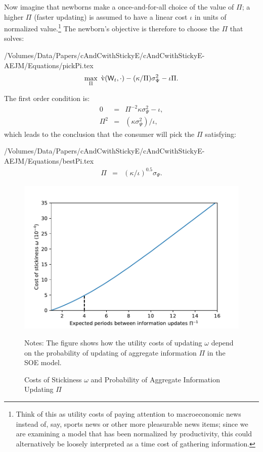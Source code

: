Now imagine that newborns make a once-and-for-all choice of the value of $\Pi$; a higher $\Pi$ (faster updating) is assumed to have a linear cost $\iota$ in units of normalized value.\footnote{Think of this as utility costs of paying attention to macroeconomic news instead of, say, sports news or other more pleasurable news items; since we are examining a model that has been normalized by productivity, this could alternatively be loosely interpreted as a time cost of gathering information.}  The newborn's objective is therefore to choose the $\Pi$ that solves:
\begin{verbatimwrite}{/Volumes/Data/Papers/cAndCwithStickyE/cAndCwithStickyE-AEJM/Equations/pickPi.tex}
\begin{eqnarray*}
   \max_{\Pi} ~ \grave{\mathrm{v}}(\mathsf{W}_t,\cdot)-(\kappa/\Pi)\sigma^{2}_{\Psi}-\iota\Pi. \label{eq:pickPi}
\end{eqnarray*}
\end{verbatimwrite}

The first order condition is:
\begin{eqnarray*}
     0 & = & \Pi^{-2}\kappa\sigma^{2}_{\Psi}-\iota,
\\  \Pi^{2} & = & (\kappa \sigma^{2}_{\Psi})/\iota,
\end{eqnarray*}
which leads to the conclusion that the consumer will
pick the $\Pi$ satisfying:
\begin{verbatimwrite}{/Volumes/Data/Papers/cAndCwithStickyE/cAndCwithStickyE-AEJM/Equations/bestPi.tex}
\begin{eqnarray*}
  \Pi & = &  (\kappa/\iota)^{0.5} \sigma_{\Psi}. \label{eq:bestPi}
\end{eqnarray*}
\end{verbatimwrite}



\begin{figure}
  \centering
\caption{Costs of Stickiness $\omega$ and Probability of Aggregate Information Updating $\Pi$}
\label{costOfStickiness}
{ \includegraphics[width=1.0\textwidth]{./Figures/uCostvsPiInv}}

\footnotesize Notes: The figure shows how the utility costs of updating $\omega$ depend on the probability of updating of aggregate information $\Pi$ in the SOE model.
\end{figure}

